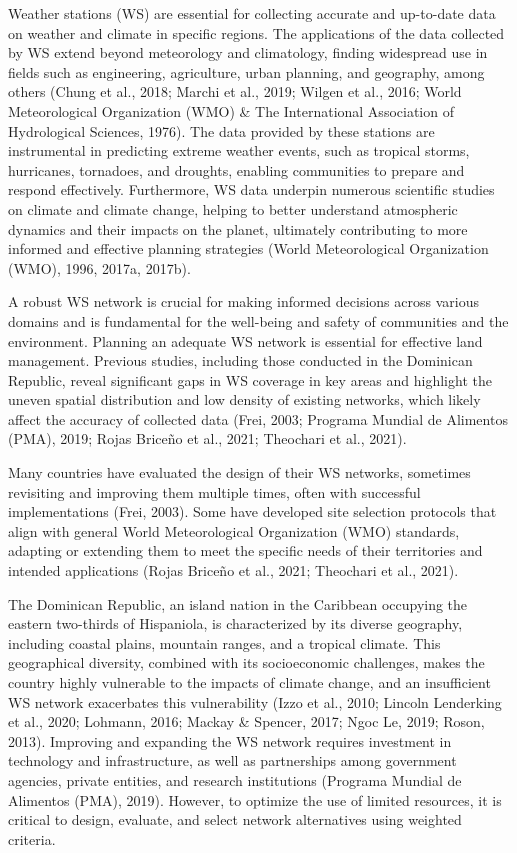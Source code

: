 \documentclass[spanish]{article}
\begin{document}
Weather stations (WS) are essential for collecting accurate and
up-to-date data on weather and climate in specific regions. The
applications of the data collected by WS extend beyond meteorology and
climatology, finding widespread use in fields such as engineering,
agriculture, urban planning, and geography, among others (Chung et al.,
2018; Marchi et al., 2019; Wilgen et al., 2016; World Meteorological
Organization (WMO) \& The International Association of Hydrological
Sciences, 1976). The data provided by these stations are instrumental in
predicting extreme weather events, such as tropical storms, hurricanes,
tornadoes, and droughts, enabling communities to prepare and respond
effectively. Furthermore, WS data underpin numerous scientific studies
on climate and climate change, helping to better understand atmospheric
dynamics and their impacts on the planet, ultimately contributing to
more informed and effective planning strategies (World Meteorological
Organization (WMO), 1996, 2017a, 2017b).

A robust WS network is crucial for making informed decisions across
various domains and is fundamental for the well-being and safety of
communities and the environment. Planning an adequate WS network is
essential for effective land management. Previous studies, including
those conducted in the Dominican Republic, reveal significant gaps in WS
coverage in key areas and highlight the uneven spatial distribution and
low density of existing networks, which likely affect the accuracy of
collected data (Frei, 2003; Programa Mundial de Alimentos (PMA), 2019;
Rojas Briceño et al., 2021; Theochari et al., 2021).

Many countries have evaluated the design of their WS networks, sometimes
revisiting and improving them multiple times, often with successful
implementations (Frei, 2003). Some have developed site selection
protocols that align with general World Meteorological Organization
(WMO) standards, adapting or extending them to meet the specific needs
of their territories and intended applications (Rojas Briceño et al.,
2021; Theochari et al., 2021).

The Dominican Republic, an island nation in the Caribbean occupying the
eastern two-thirds of Hispaniola, is characterized by its diverse
geography, including coastal plains, mountain ranges, and a tropical
climate. This geographical diversity, combined with its socioeconomic
challenges, makes the country highly vulnerable to the impacts of
climate change, and an insufficient WS network exacerbates this
vulnerability (Izzo et al., 2010; Lincoln Lenderking et al., 2020;
Lohmann, 2016; Mackay \& Spencer, 2017; Ngoc Le, 2019; Roson, 2013).
Improving and expanding the WS network requires investment in technology
and infrastructure, as well as partnerships among government agencies,
private entities, and research institutions (Programa Mundial de
Alimentos (PMA), 2019). However, to optimize the use of limited
resources, it is critical to design, evaluate, and select network
alternatives using weighted criteria.
\end{document}
